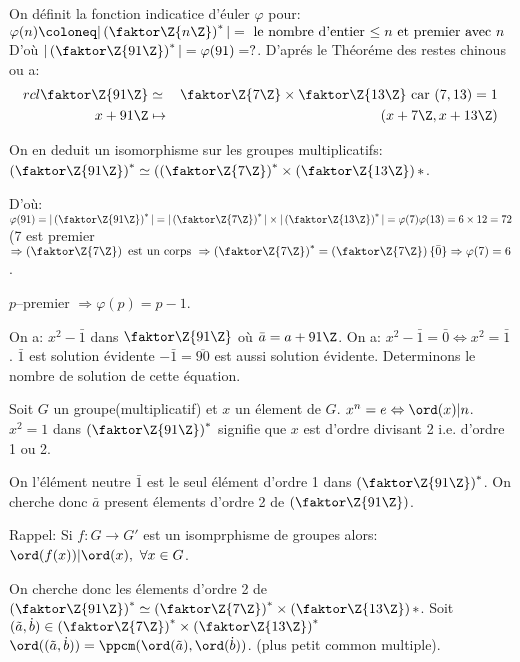 On définit la fonction indicatice d'éuler $\varphi $ pour: $\varphi (n)\coloneq|\left(\faktor\Z{n\Z}\right)^\ast|=\mbox{ le nombre d'entier $\leq n$ et premier avec $n$}$ D'où $|\left(\faktor\Z{91\Z}\right)^\ast|=\varphi (91)=?$. D'aprés le Théoréme des restes chinous ou a:
\begin{align}{rcl}
	\faktor\Z{91\Z} &\simeq& \faktor\Z{7\Z}\times \faktor\Z{13\Z}\text{ car } (7,13)=1\\
	x+91\Z &\mapsto& (x+7\Z,x+13\Z)
\end{align}

On en deduit un isomorphisme sur les groupes multiplicatifs: $\left(\faktor\Z{91\Z}\right)^\ast\simeq(\left(\faktor\Z{7\Z}\right)^\ast\times \left(\faktor\Z{13\Z}\right)
\ast$. 

D'où: $\varphi (91)=|\left(\faktor\Z{91\Z}\right)^\ast |=|\left(\faktor\Z{7\Z}\right)^\ast|\times|\left(\faktor\Z{13\Z}\right)^\ast|= \varphi (7)\varphi (13)=6\times 12=72$
(7 est premier $\Rightarrow \left(\faktor\Z{7\Z}\right) \text{ est un corps } \Rightarrow \left(\faktor\Z{7\Z}\right)^\ast=\left(\faktor\Z{7\Z}\right)\\ \{\bar 0\} \Rightarrow \varphi (7)=6$.

$p$--premier $\Rightarrow \varphi (p)=p-1$.

On a: $x^2-\bar 1$ dans $\faktor\Z{91\Z}$ où $\bar a=a+91\Z$. On a: $x^2-\bar 1 =\bar 0 \Leftrightarrow x^2=\bar 1$. $\bar 1$ est solution évidente $-\bar 1=\overline{90}$ est aussi solution évidente. Determinons le nombre de solution de cette équation.

\begin{remark}
	Soit $G$ un groupe(multiplicatif) et $x$ un élement de $G$. $x^n=e\Leftrightarrow \ord(x)|n$. $x^2=1$ dans $\left(\faktor\Z{91\Z}\right)^\ast$ signifie que $x$ est d'ordre divisant 2 i.e. d'ordre 1 ou 2.
	
	On l'élément neutre $\bar 1$ est le seul élément d'ordre 1 dans $\left(\faktor\Z{91\Z}\right)^\ast$. On cherche donc $\bar a$ present élements d'ordre 2 de $\left(\faktor\Z{91\Z}\right)$. 
\end{remark}

Rappel: Si $f:G\rightarrow G'$ est un isomprphisme de groupes alors: $\ord(f(x))|\ord(x),\ \forall x\in G$.

On cherche donc les élements d'ordre 2 de $\left(\faktor\Z{91\Z}\right)^\ast\simeq \left(\faktor\Z{7\Z}\right)^\ast\times \left(\faktor\Z{13\Z}\right)
\ast$. Soit $(\tilde a, \dot b)\in \left( \faktor\Z{7\Z} \right)^\ast \times \left( \faktor\Z{13\Z} \right)^\ast$ $\ord((\tilde a,\dot b))=\ppcm(\ord(\tilde a),\ord(\dot b))$. (plus petit common multiple).

